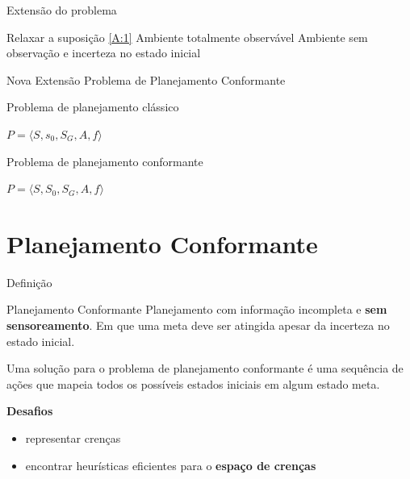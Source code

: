 \begin{frame}{Extensão do problema}
    \begin{block}{Relaxar a suposição \ref{A:1} Ambiente totalmente observável}
        Ambiente sem observação e incerteza no estado inicial
    \end{block}
    
    \begin{block}{Nova Extensão}
        Problema de Planejamento Conformante
    \end{block}
    \pause
    \begin{block}{Problema de planejamento clássico}
        \begin{center}
            $P = \langle S, s_0, S_G, A, f \rangle$
        \end{center}
    \end{block}
    
    \begin{block}{Problema de planejamento conformante}
        \begin{center}
            $P = \langle S, S_0, S_G, A, f \rangle$
        \end{center}
    \end{block}
\end{frame}




\section{Planejamento Conformante}

\begin{frame}{Definição}
    \begin{block}{Planejamento Conformante}
    {  Planejamento com informação incompleta e \textbf{sem sensoreamento}. Em 
    que uma meta deve ser atingida apesar da incerteza no estado inicial.}
    \end{block}

    { \small Uma solução para o problema de planejamento conformante é uma sequência de ações 
    que mapeia todos os possíveis estados iniciais em algum estado meta.} \\
    \pause
    \begin{block}{ \alert{\bf Desafios}}
        \begin{itemize}
         \item representar crenças
         \item encontrar heurísticas eficientes para o \textbf{espaço de crenças}
        \end{itemize}
    
    \end{block}

\end{frame}

